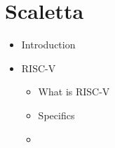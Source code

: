 \chapter{Scaletta}
\label{cha:Scaletta}

\begin{itemize}
  \item Introduction

  \item RISC-V
    \begin{itemize}
      \item What is RISC-V

      \item Specifics

      \item
    \end{itemize}
\end{itemize}